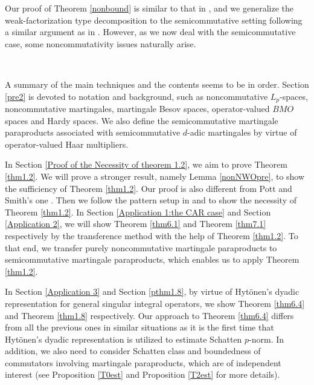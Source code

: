 \documentclass[oneside,english,a4wide]{amsart}
\numberwithin{equation}{section}
\numberwithin{figure}{section}
\theoremstyle{plain}
\theoremstyle{plain}
\theoremstyle{definition}
\theoremstyle{plain}
\theoremstyle{remark}
\theoremstyle{definition}
\theoremstyle{remark}
\theoremstyle{definition}
\newcommand{\8}{\infty}
\begin{document}
Our proof of Theorem \ref{nonbound} is similar to that in \cite{TH3}, and we generalize the weak-factorization type decomposition to the semicommutative setting following a similar argument as in \cite{TH3}. However, as we now deal with the semicommutative case, some noncommutativity issues naturally arise. 

\

A summary of the main techniques and the contents seems to be in order. Section \ref{pre2} is devoted to notation and background, such as noncommutative $L_p$-spaces, noncommutative martingales, martingale Besov spaces, operator-valued $BMO$ spaces and Hardy spaces. We also define the semicommutative martingale paraproducts associated with semicommutative $d$-adic martingales by virtue of operator-valued Haar multipliers.

In Section \ref{Proof of the Necessity of theorem 1.2}, we aim to prove Theorem \ref{thm1.2}. We will prove a stronger result, namely Lemma \ref{nonNWOpre}, to show the sufficiency of Theorem \ref{thm1.2}. Our proof is also different from Pott and Smith's one \cite{PS}. Then we follow the pattern setup in \cite{PS} and \cite{P} to show the necessity of Theorem \ref{thm1.2}. In Section \ref{Application 1:the CAR case} and Section \ref{Application 2}, we will show Theorem \ref{thm6.1} and Theorem \ref{thm7.1} respectively by the transference method with the help of Theorem \ref{thm1.2}. To that end, we transfer purely noncommutative martingale paraproducts to semicommutative martingale paraproducts, which enables us to apply Theorem \ref{thm1.2}.

 In Section \ref{Application 3} and Section \ref{pthm1.8}, by virtue of Hyt\"{o}nen's dyadic representation for general singular integral operators, we show Theorem \ref{thm6.4} and Theorem \ref{thm1.8} respectively. Our approach to Theorem \ref{thm6.4} differs from all the previous ones in similar situations as it is the first time that Hyt\"{o}nen's dyadic representation is utilized to estimate Schatten $p$-norm. In addition, we also need to consider Schatten class and boundedness of commutators involving martingale paraproducts, which are of independent interest (see Proposition \ref{T0est} and Proposition \ref{T2est} for more details). 
\end{document}
